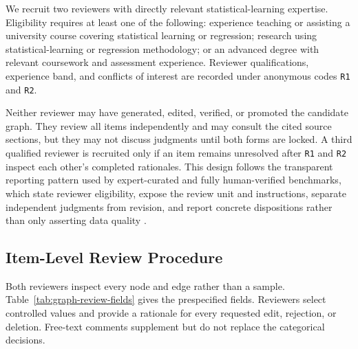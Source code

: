We recruit two reviewers with directly relevant statistical-learning expertise. Eligibility requires at least one of the following: experience teaching or assisting a university course covering statistical learning or regression; research using statistical-learning or regression methodology; or an advanced degree with relevant coursework and assessment experience. Reviewer qualifications, experience band, and conflicts of interest are recorded under anonymous codes \texttt{R1} and \texttt{R2}.

Neither reviewer may have generated, edited, verified, or promoted the candidate graph. They review all items independently and may consult the cited source sections, but they may not discuss judgments until both forms are locked. A third qualified reviewer is recruited only if an item remains unresolved after \texttt{R1} and \texttt{R2} inspect each other's completed rationales. This design follows the transparent reporting pattern used by expert-curated and fully human-verified benchmarks, which state reviewer eligibility, expose the review unit and instructions, separate independent judgments from revision, and report concrete dispositions rather than only asserting data quality \citep{kim2023fantom,chen2024tombench,zhang2024edc,chen2024sackg}.

\subsection{Item-Level Review Procedure}

Both reviewers inspect every node and edge rather than a sample. Table~\ref{tab:graph-review-fields} gives the prespecified fields. Reviewers select controlled values and provide a rationale for every requested edit, rejection, or deletion. Free-text comments supplement but do not replace the categorical decisions.

